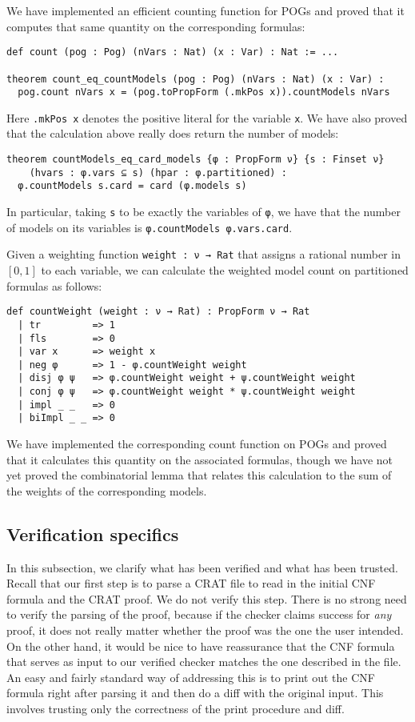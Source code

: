 We have implemented an efficient counting function for POGs and proved that
it computes that same quantity on the corresponding formulas:
\begin{lstlisting}
def count (pog : Pog) (nVars : Nat) (x : Var) : Nat := ...

theorem count_eq_countModels (pog : Pog) (nVars : Nat) (x : Var) :
  pog.count nVars x = (pog.toPropForm (.mkPos x)).countModels nVars
\end{lstlisting}
Here \lstinline{.mkPos x} denotes the positive literal for the variable \lstinline{x}. We have also proved that the calculation above really does
return the number of models:
\begin{lstlisting}
theorem countModels_eq_card_models {φ : PropForm ν} {s : Finset ν}
    (hvars : φ.vars ⊆ s) (hpar : φ.partitioned) :
  φ.countModels s.card = card (φ.models s)
\end{lstlisting}
In particular, taking \lstinline{s} to be exactly the variables of \lstinline{φ},
we have that the number of models on its variables is \lstinline{φ.countModels φ.vars.card}.

Given a weighting function \lstinline{weight : ν → Rat} that assigns a rational
number in $[0, 1]$ to each variable, we can calculate the weighted model count on
partitioned formulas as follows:
\begin{lstlisting}
def countWeight (weight : ν → Rat) : PropForm ν → Rat
  | tr         => 1
  | fls        => 0
  | var x      => weight x
  | neg φ      => 1 - φ.countWeight weight
  | disj φ ψ   => φ.countWeight weight + ψ.countWeight weight
  | conj φ ψ   => φ.countWeight weight * ψ.countWeight weight
  | impl _ _   => 0
  | biImpl _ _ => 0
\end{lstlisting}
We have implemented the corresponding count function on POGs and proved that
it calculates this quantity on the associated formulas,
though we have not yet proved the combinatorial lemma
that relates this calculation to the sum of the weights of the corresponding models.

\subsection{Verification specifics}
\label{subsection:verification:specifics}

In this subsection, we clarify what has been verified and what has been trusted.
Recall that our first step is to parse a CRAT file to read in the initial CNF formula
and the CRAT proof. We do not verify this step. There is no strong need to verify the
parsing of the proof, because if the checker claims success for \emph{any} proof, it does not really matter
whether the proof was the one the user intended.
On the other hand, it would be nice to have reassurance that the CNF formula that serves
as input to our verified checker matches the one described in the file.
An easy and fairly standard way of addressing this is to print out the CNF formula
right after parsing it and then do a diff with the original input.
This involves trusting only the correctness of the print procedure and diff.

